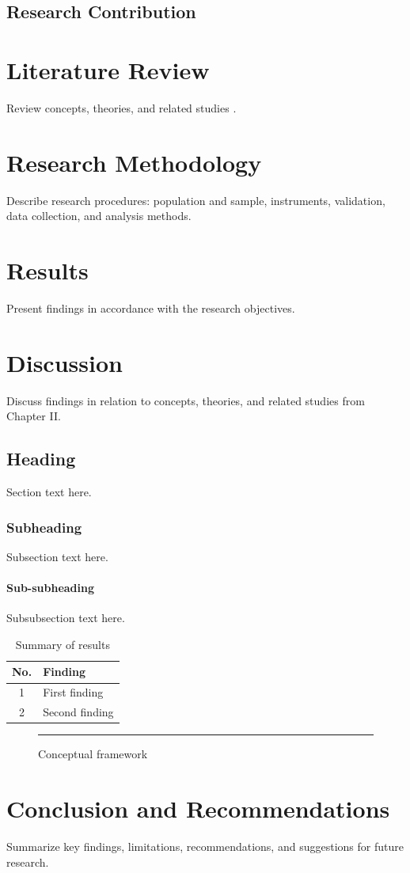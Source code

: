 \documentclass{muthesis2026}
\begin{document}
\section{Research Contribution}

\chapter{Literature Review}
Review concepts, theories, and related studies \cite{mount2004bioinformatics}.

\chapter{Research Methodology}
Describe research procedures: population and sample, instruments, validation, data collection, and analysis methods.

\chapter{Results}
Present findings in accordance with the research objectives.

\chapter{Discussion}
Discuss findings in relation to concepts, theories, and related studies from Chapter II.

\section{Heading}
Section text here.

\subsection{Subheading}
Subsection text here.

\subsubsection{Sub-subheading}
Subsubsection text here.

\begin{table}[h]
\centering
\caption{Summary of results}
\begin{tabular}{cl}
\hline
No. & Finding \\
\hline
1 & First finding \\
2 & Second finding \\
\hline
\end{tabular}
\end{table}

\begin{figure}[h]
\centering
\rule{6cm}{4cm}
\caption{Conceptual framework}
\end{figure}

\chapter{Conclusion and Recommendations}
Summarize key findings, limitations, recommendations, and suggestions for future research.




\biography
\end{document}
